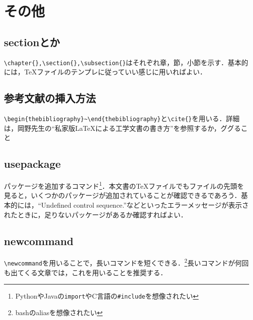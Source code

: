 \documentclass[11pt,a4paper]{jsarticle}
\begin{document}
\section{その他}

\subsection{sectionとか}

\verb|\chapter{},\section{},\subsection{}|はそれぞれ章，節，小節を示す．基本的には，\TeX ファイルのテンプレに従っていい感じに用いればよい．

\subsection{参考文献の挿入方法}

\verb|\begin{thebibliography}~\end{thebibliography}|と\verb|\cite{}|を用いる．詳細は，岡野先生の``私家版\LaTeX による工学文書の書き方''を参照するか，ググること

\subsection{usepackage}

パッケージを追加するコマンド\footnote{PythonやJavaの\verb|import|やC言語の\verb|#include|を想像されたい}．本文書の\TeX ファイルでもファイルの先頭を見ると，いくつかのパッケージが追加されていることが確認できるであろう．基本的には，``Undefined control sequence.''などといったエラーメッセージが表示されたときに，足りないパッケージがあるか確認すればよい．

\subsection{newcommand}

\verb|\newcommand|を用いることで，長いコマンドを短くできる．\footnote{bashのaliasを想像されたい}長いコマンドが何回も出てくる文章では，これを用いることを推奨する．
\end{document}
